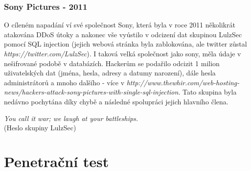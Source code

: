 \documentclass[12pt, a4paper]{report}
\begin{document}
\subsection{Sony Pictures - 2011}
O cíleném napadání ví své společnost Sony, která byla v roce 2011 několikrát atakována DDoS útoky a nakonec vše vyústilo v odcizení dat skupinou LulzSec pomocí SQL injection (jejich webová stránka byla zablokována, ale twitter zůstal \textit{https://twitter.com/LulzSec}). I taková velká společnost jako sony, měla údaje v nešifrované podobě v databázích. Hackerům se podařilo odcizit 1 milion uživatelských dat (jména, hesla, adresy a datumy narození), dále hesla administrátorů a mnoho dalšího - více v \textit{http://www.thewhir.com/web-hosting-news/hackers-attack-sony-pictures-with-single-sql-injection}. Tato skupina byla nedávno pochytána díky chybě a následné spolupráci jejich hlavního člena.

\begin{center}
\textit{You call it war; we laugh at your battleships.}\\
(Heslo skupiny LulzSec)
\end{center}



\chapter{Penetrační test}
\end{document}
